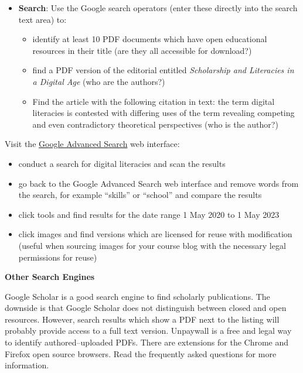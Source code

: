 \documentclass[
  letterpaper,
  DIV=11,
  numbers=noendperiod]{scrreprt}
\providecommand{\tightlist}{%
  \setlength{\itemsep}{0pt}\setlength{\parskip}{0pt}}\usepackage{longtable,booktabs,array}
\begin{document}
\begin{tcolorbox}
\begin{tcolorbox}
\begin{itemize}
\tightlist
\item
  \textbf{Search}: Use the Google search operators (enter these directly
  into the search text area) to:

  \begin{itemize}
  \tightlist
  \item
    identify at least 10 PDF documents which have open educational
    resources in their title (are they all accessible for download?)
  \item
    find a PDF version of the editorial entitled \emph{Scholarship and
    Literacies in a Digital Age} (who are the authors?)
  \item
    Find the article with the following citation in text: the term
    digital literacies is contested with differing uses of the term
    revealing competing and even contradictory theoretical perspectives
    (who is the author?)
  \end{itemize}
\end{itemize}

Visit the \href{https://www.google.com/advanced_search}{Google Advanced
Search} web interface:

\begin{itemize}
\tightlist
\item
  conduct a search for digital literacies and scan the results
\item
  go back to the Google Advanced Search web interface and remove words
  from the search, for example ``skills'' or ``school'' and compare the
  results
\item
  click tools and find results for the date range 1 May 2020 to 1 May
  2023
\item
  click images and find versions which are licensed for reuse with
  modification (useful when sourcing images for your course blog with
  the necessary legal permissions for reuse)
\end{itemize}

\textbf{Other Search Engines}

Google Scholar is a good search engine to find scholarly publications.
The downside is that Google Scholar does not distinguish between closed
and open resources. However, search results which show a PDF next to the
listing will probably provide access to a full text version. Unpaywall
is a free and legal way to identify authored--uploaded PDFs. There are
extensions for the Chrome and Firefox open source browsers. Read the
frequently asked questions for more information.


\end{tcolorbox}
\end{tcolorbox}
\end{document}
